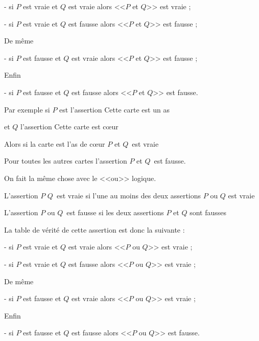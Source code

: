 - si $P$ est vraie et $Q$ est vraie alors <<$P$ et $Q$>> est vraie ;

\change

- si $P$ est vraie et $Q$ est fausse alors <<$P$ et $Q$>> est fausse ;

\change

De même 

- si $P$ est fausse et $Q$ est vraie alors <<$P$ et $Q$>> est fausse ;

\change

Enfin 

- si $P$ est fausse et $Q$ est fausse alors <<$P$ et $Q$>> est fausse.

\change

Par exemple si $P$ est l'assertion \og Cette carte est un as\fg

et $Q$ l'assertion \og Cette carte est c\oe ur\fg

Alors si la carte est l'as de c\oe ur \og $P$ et $Q$\fg\ est vraie 

Pour toutes les autres cartes l'assertion \og $P$ et $Q$\fg\ est fausse.


\diapo

On fait la même chose avec le <<ou>> logique.

L'assertion \og $P$  $Q$\fg\ est vraie si l'une au moins des deux assertions $P$ ou $Q$ est vraie

L'assertion \og $P$ ou $Q$\fg\ est fausse si les deux assertions $P$ et $Q$ sont fausses


\change

La table de vérité de cette assertion est donc la suivante :

\change

- si $P$ est vraie et $Q$ est vraie alors <<$P$ ou $Q$>> est vraie ;

\change

- si $P$ est vraie et $Q$ est fausse alors <<$P$ ou $Q$>> est vraie ;

\change

De même 

- si $P$ est fausse et $Q$ est vraie alors <<$P$ ou $Q$>> est vraie ;

\change

Enfin 

- si $P$ est fausse et $Q$ est fausse alors <<$P$ ou $Q$>> est fausse.




\change

